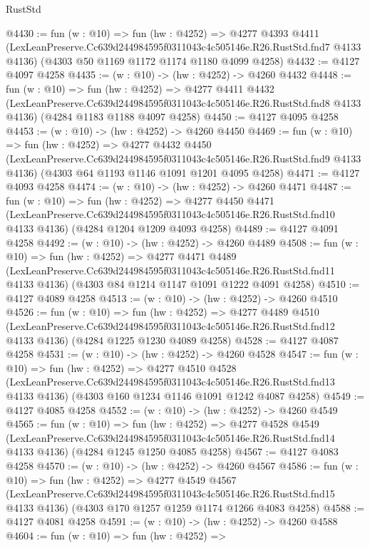 \begin{lexlean}{RustStd}
\begin{coremodule}
@4430 := fun (w : @10) =>
  fun (hw : @4252) =>
  @4277
    @4393
    @4411
    (LexLeanPreserve.Cc639d244984595f0311043c4c505146e.R26.RustStd.fnd7 @4133 @4136)
    (@4303 @50 @1169 @1172 @1174 @1180 @4099 @4258)
@4432 := @4127 @4097 @4258
@4435 := (w : @10) -> (hw : @4252) -> @4260 @4432
@4448 := fun (w : @10) =>
  fun (hw : @4252) =>
  @4277
    @4411
    @4432
    (LexLeanPreserve.Cc639d244984595f0311043c4c505146e.R26.RustStd.fnd8 @4133 @4136)
    (@4284 @1183 @1188 @4097 @4258)
@4450 := @4127 @4095 @4258
@4453 := (w : @10) -> (hw : @4252) -> @4260 @4450
@4469 := fun (w : @10) =>
  fun (hw : @4252) =>
  @4277
    @4432
    @4450
    (LexLeanPreserve.Cc639d244984595f0311043c4c505146e.R26.RustStd.fnd9 @4133 @4136)
    (@4303 @64 @1193 @1146 @1091 @1201 @4095 @4258)
@4471 := @4127 @4093 @4258
@4474 := (w : @10) -> (hw : @4252) -> @4260 @4471
@4487 := fun (w : @10) =>
  fun (hw : @4252) =>
  @4277
    @4450
    @4471
    (LexLeanPreserve.Cc639d244984595f0311043c4c505146e.R26.RustStd.fnd10 @4133 @4136)
    (@4284 @1204 @1209 @4093 @4258)
@4489 := @4127 @4091 @4258
@4492 := (w : @10) -> (hw : @4252) -> @4260 @4489
@4508 := fun (w : @10) =>
  fun (hw : @4252) =>
  @4277
    @4471
    @4489
    (LexLeanPreserve.Cc639d244984595f0311043c4c505146e.R26.RustStd.fnd11 @4133 @4136)
    (@4303 @84 @1214 @1147 @1091 @1222 @4091 @4258)
@4510 := @4127 @4089 @4258
@4513 := (w : @10) -> (hw : @4252) -> @4260 @4510
@4526 := fun (w : @10) =>
  fun (hw : @4252) =>
  @4277
    @4489
    @4510
    (LexLeanPreserve.Cc639d244984595f0311043c4c505146e.R26.RustStd.fnd12 @4133 @4136)
    (@4284 @1225 @1230 @4089 @4258)
@4528 := @4127 @4087 @4258
@4531 := (w : @10) -> (hw : @4252) -> @4260 @4528
@4547 := fun (w : @10) =>
  fun (hw : @4252) =>
  @4277
    @4510
    @4528
    (LexLeanPreserve.Cc639d244984595f0311043c4c505146e.R26.RustStd.fnd13 @4133 @4136)
    (@4303 @160 @1234 @1146 @1091 @1242 @4087 @4258)
@4549 := @4127 @4085 @4258
@4552 := (w : @10) -> (hw : @4252) -> @4260 @4549
@4565 := fun (w : @10) =>
  fun (hw : @4252) =>
  @4277
    @4528
    @4549
    (LexLeanPreserve.Cc639d244984595f0311043c4c505146e.R26.RustStd.fnd14 @4133 @4136)
    (@4284 @1245 @1250 @4085 @4258)
@4567 := @4127 @4083 @4258
@4570 := (w : @10) -> (hw : @4252) -> @4260 @4567
@4586 := fun (w : @10) =>
  fun (hw : @4252) =>
  @4277
    @4549
    @4567
    (LexLeanPreserve.Cc639d244984595f0311043c4c505146e.R26.RustStd.fnd15 @4133 @4136)
    (@4303 @170 @1257 @1259 @1174 @1266 @4083 @4258)
@4588 := @4127 @4081 @4258
@4591 := (w : @10) -> (hw : @4252) -> @4260 @4588
@4604 := fun (w : @10) =>
  fun (hw : @4252) =>

\end{coremodule}
\end{lexlean}
